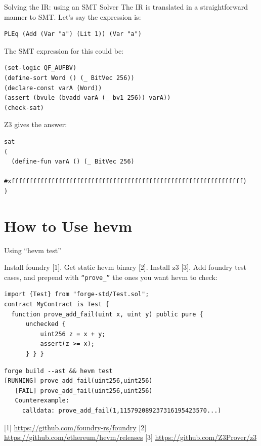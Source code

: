 \documentclass[aspectratio=169]{beamer}
\begin{document}

\begin{frame}[fragile=singleslide]{Solving the IR: using an SMT Solver}
The IR is translated in a straightforward manner to SMT. Let's say the expression is:

\begin{Verbatim}[frame=single, framerule=0.2mm, framesep=2mm,fontsize=\footnotesize]
PLEq (Add (Var "a") (Lit 1)) (Var "a")
\end{Verbatim}

The SMT expression for this could be:

\begin{Verbatim}[frame=single, framerule=0.2mm, framesep=2mm,fontsize=\footnotesize]
(set-logic QF_AUFBV)
(define-sort Word () (_ BitVec 256))
(declare-const varA (Word))
(assert (bvule (bvadd varA (_ bv1 256)) varA))
(check-sat)
\end{Verbatim}

Z3 gives the answer:

\begin{Verbatim}[frame=single, framerule=0.2mm, framesep=2mm,fontsize=\footnotesize]
sat
(
  (define-fun varA () (_ BitVec 256)
    #xffffffffffffffffffffffffffffffffffffffffffffffffffffffffffffffff)
)
\end{Verbatim}
\end{frame}

\section{How to Use hevm}

\begin{frame}[fragile=singleslide]{Using ``hevm test''}

Install foundry [1]. Get static hevm binary [2]. Install z3 [3]. Add foundry test cases, and prepend with \texttt{``prove\_''} the ones you want hevm to check:

\begin{Verbatim}[frame=single, framerule=0.2mm, framesep=2mm,fontsize=\footnotesize]
import {Test} from "forge-std/Test.sol";
contract MyContract is Test {
  function prove_add_fail(uint x, uint y) public pure {
      unchecked { 
          uint256 z = x + y;
          assert(z >= x);
      } } }
\end{Verbatim}

\begin{Verbatim}[frame=single, framerule=0.2mm, framesep=2mm,fontsize=\footnotesize]
forge build --ast && hevm test
[RUNNING] prove_add_fail(uint256,uint256)
   [FAIL] prove_add_fail(uint256,uint256)
   Counterexample:
     calldata: prove_add_fail(1,115792089237316195423570...)
\end{Verbatim}
\tiny [1] \url{https://github.com/foundry-rs/foundry} [2] \url{https://github.com/ethereum/hevm/releases} [3] \url{https://github.com/Z3Prover/z3}
\end{frame}
\end{document}
